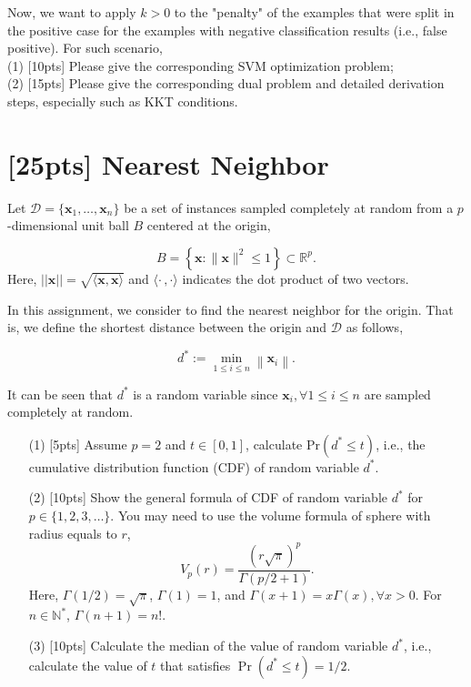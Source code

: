 \documentclass{article}
\begin{document}
    Now, we want to apply $k>0$ to the "penalty" of the examples that were split in the positive case for the examples with negative classification results (i.e., false positive). For such scenario,\\
   (1) [10pts] Please give the corresponding SVM optimization problem;\\
   (2) [15pts] Please give the corresponding dual problem and detailed derivation steps, especially such as KKT conditions.


	
	\newpage

	
	\section{[25pts] {Nearest Neighbor}}
	
	Let $\mathcal{D} = \{\mathbf{x}_1, \dots, \mathbf{x}_n\}$ be a set of instances sampled completely at random from a $p$-dimensional unit ball $B$ centered at the origin,
	
\begin{equation}
B=\left\{\mathbf{x} :\|\mathbf{x}\|^{2} \leq 1\right\} \subset \mathbb{R}^{p}.
\end{equation}
Here, $||\mathbf{x}|| = \sqrt{\langle \mathbf{x}, \mathbf{x}\rangle}$ and $\langle \cdot \,, \cdot \rangle$ indicates the dot product of two vectors.
	
In this assignment, we consider to find the nearest neighbor for the origin. That is, we define the shortest distance between the origin and $\mathcal{D}$ as follows,

\begin{equation}
d^{*} :=\min _{1 \leq i \leq n}\left\|\mathbf{x}_{i}\right\|.
\end{equation}
	
It can be seen that $d^*$ is a random variable since $\mathbf{x}_i, \forall 1 \leq i \leq n$ are sampled completely at random.	
	
	\begin{enumerate}
		\item [(1)] [5pts] Assume $ p = 2 $ and $ t \in [0, 1]$, calculate Pr$(d^* \leq t)$, i.e., the cumulative distribution function (CDF) of random variable $d^*$.
		\item [(2)] [10pts] Show the general formula of CDF of random variable $d^*$ for $p \in \{1, 2, 3, \dots \}$. You may need to use the volume formula of sphere with radius equals to $r$,
				\begin{equation}
				V_{p}(r)=\frac{(r \sqrt{\pi})^{p}}{\Gamma(p / 2+1)}.
				\end{equation}
				Here, $\Gamma(1 / 2)=\sqrt{\pi}$, $\Gamma(1)=1$, and $\Gamma(x+1)=x \Gamma(x), \forall x > 0$. For $n \in \mathbb{N}^*$, $\Gamma(n+1)=n!$.
		\item [(3)] [10pts] Calculate the median of the value of random variable $d^*$, i.e., calculate the value of $t$ that satisfies $\operatorname{Pr}\left(d^{*} \leq t\right)=1 / 2$.
	\end{enumerate}
	
\end{document}

